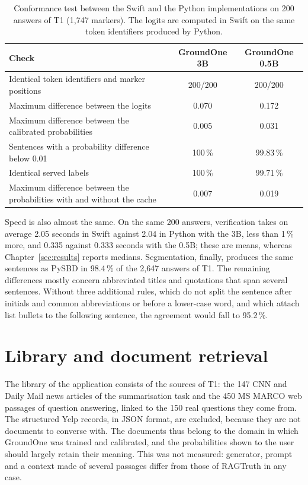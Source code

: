 \begin{table}[htbp]
\centering
\caption{Conformance test between the Swift and the Python implementations on 200 answers of T1 (1{,}747 markers). The
logits are computed in Swift on the same token identifiers produced by Python.}
\label{tab:studio-conformance}
\small
\begin{tabular}{>{\raggedright\arraybackslash}p{6.6cm}cc}
\toprule
Check & GroundOne 3B & GroundOne 0.5B \\
\midrule
Identical token identifiers and marker positions & 200/200 & 200/200 \\
Maximum difference between the logits & 0.070 & 0.172 \\
Maximum difference between the calibrated probabilities & 0.005 & 0.031 \\
Sentences with a probability difference below 0.01 & 100\,\% & 99.83\,\% \\
Identical served labels & 100\,\% & 99.71\,\% \\
Maximum difference between the probabilities with and without the cache & 0.007 & 0.019 \\
\bottomrule
\end{tabular}
\end{table}

Speed is also almost the same. On the same 200 answers, verification takes on average 2.05 seconds in Swift against 2.04 in Python with the 3B, less than 1\,\% more, and 0.335 against 0.333 seconds with the 0.5B; these are means, whereas
Chapter~\ref{sec:results} reports medians. Segmentation, finally, produces the same sentences as PySBD in 98.4\,\% of the
2{,}647 answers of T1. The remaining differences mostly concern abbreviated titles and quotations that span several
sentences. Without three additional rules, which do not split the sentence after initials and common abbreviations or
before a lower-case word, and which attach list bullets to the following sentence, the agreement would fall to
95.2\,\%.

\section{Library and document retrieval}
\label{sec:studio-library}

The library of the application consists of the sources of T1: the 147 CNN and Daily Mail news articles of the
summarisation task and the 450 MS MARCO web passages of question answering, linked to the 150 real questions they come
from. The structured Yelp records, in JSON format, are excluded, because they are not documents to converse with. The
documents thus belong to the domain in which GroundOne was trained and calibrated, and the probabilities shown to the
user should largely retain their meaning. This was not measured: generator, prompt and a context made of several
passages differ from those of RAGTruth in any case.

